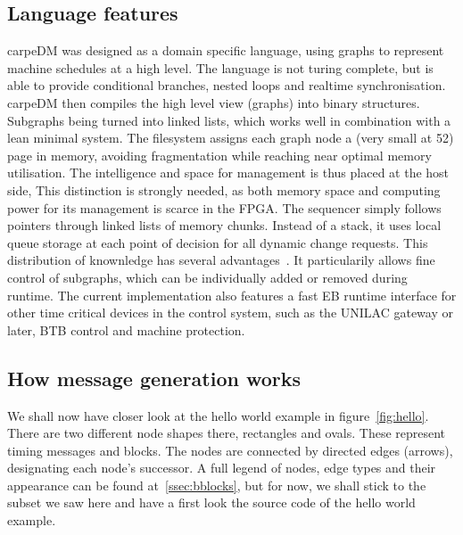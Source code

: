 \subsection{Language features}
carpeDM was designed as a domain specific language, using graphs to represent machine schedules at a high level. The language is not turing complete, but is able to provide
conditional branches, nested loops and realtime synchronisation.
carpeDM then compiles the high level view (graphs) into binary structures. Subgraphs being turned into linked lists, which works well in combination with a lean minimal system.
The filesystem assigns each graph node a (very small at \SI{52}{\byte}) page in memory, avoiding fragmentation while reaching near optimal memory utilisation.
The intelligence and space for management is thus placed at the host side, This distinction is strongly needed, as both memory space and computing power for its management is scarce in the FPGA.
The sequencer simply follows pointers through linked lists of memory chunks. Instead of a stack, it uses local queue storage at each point of decision for all dynamic change requests.
This distribution of knownledge has several advantages~\cite[]{}. It particularily allows fine control of subgraphs, which can be individually added or removed during runtime.
The current implementation also features a fast EB runtime interface for other time critical devices in the control system, such as the UNILAC gateway or later, BTB control and machine protection.


\subsection{How message generation works}

We shall now have closer look at the hello world example in figure~\ref{fig:hello}. There are two different node shapes there, rectangles and ovals. These represent timing messages and blocks. The nodes are connected by directed edges (arrows), designating each node's successor. A full legend of nodes, edge types and their appearance can be found at~\ref{ssec:bblocks}, but for now, we shall stick to the subset we saw here and have a first look the source code of the hello world example.
%

